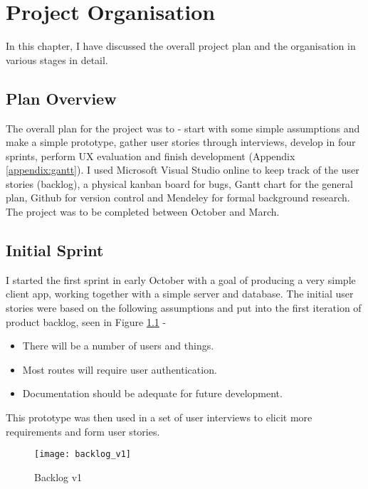 \chapter{Project Organisation}
\label{chap:proj-org}
In this chapter, I have discussed the overall project plan and the organisation in various stages in detail.

\section{Plan Overview}

The overall plan for the project was to - start with some simple assumptions and make a simple prototype, gather user stories through interviews, develop in four sprints, perform UX evaluation and finish development (Appendix \ref{appendix:gantt}). I used Microsoft Visual Studio online to keep track of the user stories (backlog), a physical kanban board for bugs, Gantt chart for the general plan, Github for version control and Mendeley for formal background research. The project was to be completed between October and March.

\section{Initial Sprint}

I started the first sprint in early October with a goal of producing a very simple client app, working together with a simple server and database. The initial user stories were based on the following assumptions and put into the first iteration of product backlog, seen in Figure \ref{fig:backlog-v1} - 

\begin{itemize}
	\item There will be a number of users and things.
	\item Most routes will require user authentication.
	\item Documentation should be adequate for future development.
\end{itemize}

This prototype was then used in a set of user interviews to elicit more requirements and form user stories.

\begin{figure}[!h]
    \centering
    \texttt{[image: backlog\_v1]}
    \caption{Backlog v1}\label{fig:backlog-v1}
\end{figure}

